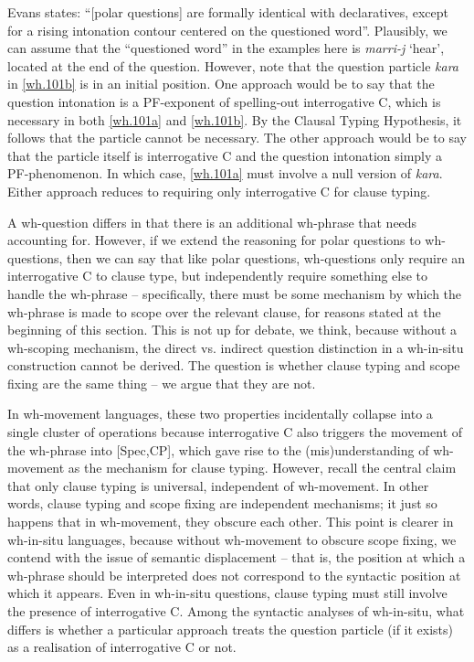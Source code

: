 \documentclass{glossa}
\begin{document}
Evans states: ``[polar questions] are formally identical with declaratives, except for a rising intonation contour centered on the questioned word''. Plausibly, we can assume that the ``questioned word'' in the examples here is \textit{marri-j} `hear', located at the end of the question. However, note that the question particle \textit{kara} in \ref{wh.101b} is in an initial position. One approach would be to say that the question intonation is a PF-exponent of spelling-out interrogative C, which is necessary in both \ref{wh.101a} and \ref{wh.101b}. By the Clausal Typing Hypothesis, it follows that the particle cannot be necessary. The other approach would be to say that the particle itself is interrogative C and the question intonation simply a PF-phenomenon. In which case, \ref{wh.101a} must involve a null version of \textit{kara}. Either approach reduces to requiring only interrogative C for clause typing.

A wh-question differs in that there is an additional wh-phrase that needs accounting for. However, if we extend the reasoning for polar questions to wh-questions, then we can say that like polar questions, wh-questions only require an interrogative C to clause type, but independently require something else to handle the wh-phrase -- specifically, there must be some mechanism by which the wh-phrase is made to scope over the relevant clause, for reasons stated at the beginning of this section. This is not up for debate, we think, because without a wh-scoping mechanism, the direct vs. indirect question distinction in a wh-in-situ construction cannot be derived. The question is whether clause typing and scope fixing are the same thing -- we argue that they are not.

In wh-movement languages, these two properties incidentally collapse into a single cluster of operations because interrogative C also triggers the movement of the wh-phrase into [Spec,CP], which gave rise to the (mis)understanding of wh-movement as the mechanism for clause typing. However, recall the central claim that only clause typing is universal, independent of wh-movement. In other words, clause typing and scope fixing are independent mechanisms; it just so happens that in wh-movement, they obscure each other. This point is clearer in wh-in-situ languages, because without wh-movement to obscure scope fixing, we contend with the issue of semantic displacement -- that is, the position at which a wh-phrase should be interpreted does not correspond to the syntactic position at which it appears. Even in wh-in-situ questions, clause typing must still involve the presence of interrogative C. Among the syntactic analyses of wh-in-situ, what differs is whether a particular approach treats the question particle (if it exists) as a realisation of interrogative C or not.
\end{document}

